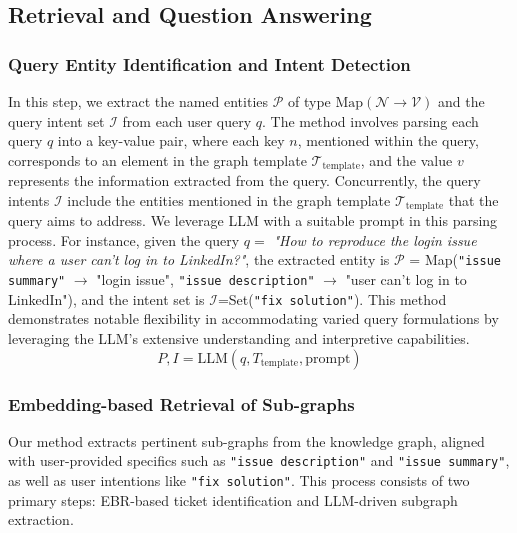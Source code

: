 \documentclass[sigconf]{acmart}
\begin{document}

\subsection{Retrieval and Question Answering}
\subsubsection{Query Entity Identification and Intent Detection}
\label{subsubsection:query_entity_identification_and_intent_detection}
In this step, we extract the named entities \(\mathcal{P}\) of type \(\text{Map}(\mathcal{N} \rightarrow \mathcal{V})\) and the query intent set \(\mathcal{I}\) from each user query \(q\). The method involves parsing each query \(q\) into a key-value pair, where each key \(n\), mentioned within the query, corresponds to an element in the graph template \(\mathcal{T}_{\text{template}}\), and the value \(v\) represents the information extracted from the query. Concurrently, the query intents \(\mathcal{I}\) include the entities mentioned in the graph template \(\mathcal{T}_{\text{template}}\) that the query aims to address. We leverage LLM with a suitable prompt in this parsing process. For instance, given the query \(q=\) \textit{"How to reproduce the login issue where a user can't log in to LinkedIn?"}, the extracted entity is \(\mathcal{P}\) = Map(\texttt{"issue summary"} $\rightarrow$ "login issue", \texttt{"issue description"} $\rightarrow$ "user can’t log in to LinkedIn"), and the intent set is \(\mathcal{I}\)=Set(\texttt{"fix solution"}). This method demonstrates notable flexibility in accommodating varied query formulations by leveraging the LLM's extensive understanding and interpretive capabilities.
$$ P, I = \text{LLM}(q, T_{\text{template}}, \text{prompt}) $$

\subsubsection{Embedding-based Retrieval of Sub-graphs}
\label{subsubsection:embedding-based_retrieval_of_sub-graphs}
Our method extracts pertinent sub-graphs from the knowledge graph, aligned with user-provided specifics such as \texttt{"issue description"} and \texttt{"issue summary"}, as well as user intentions like \texttt{"fix solution"}. This process consists of two primary steps: EBR-based ticket identification and LLM-driven subgraph extraction.
\end{document}

